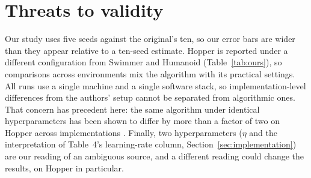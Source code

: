 \section{Threats to validity}
\label{sec:discussion}

Our study uses five seeds against the original's ten, so our error bars are
wider than they appear relative to a ten-seed estimate. Hopper is reported
under a different configuration from Swimmer and Humanoid
(Table~\ref{tab:ours}), so comparisons across environments mix the algorithm
with its practical settings. All runs use a single machine and a single
software stack, so implementation-level differences from the authors' setup
cannot be separated from algorithmic ones. That concern has precedent here:
the same algorithm under identical hyperparameters has been shown to differ by
more than a factor of two on Hopper across implementations
\citep{henderson2018matters}. Finally, two hyperparameters ($\eta$ and the
interpretation of Table~4's learning-rate column,
Section~\ref{sec:implementation}) are our reading of an ambiguous source, and
a different reading could change the results, on Hopper in particular.
